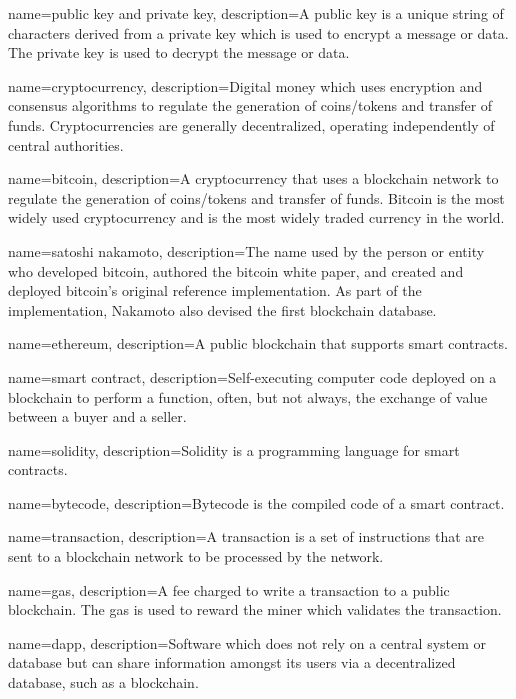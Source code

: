  {
	name=public key and private key,
	description={A public key is a unique string of characters derived from a private key which is used to encrypt a message or data. The private key is used to decrypt the message or data.}
}


 {
	name=cryptocurrency,
	description={Digital money which uses encryption and consensus algorithms to regulate the generation of coins/tokens and transfer of funds. Cryptocurrencies are generally decentralized, operating independently of central authorities.}
}

 {
	name=bitcoin,
	description={A cryptocurrency that uses a blockchain network to regulate the generation of coins/tokens and transfer of funds. Bitcoin is the most widely used cryptocurrency and is the most widely traded currency in the world.}
}

 {
	name=satoshi nakamoto,
	description={The name used by the person or entity who developed bitcoin, authored the bitcoin white paper, and created and deployed bitcoin's original reference implementation. As part of the implementation, Nakamoto also devised the first blockchain database.}
}


 {
	name=ethereum,
	description={A public blockchain that supports smart contracts.}
}

 {
	name=smart contract,
	description={Self-executing computer code deployed on a blockchain to perform a function, often, but not always, the exchange of value between a buyer and a seller.}
}

 {
	name=solidity,
	description={Solidity is a programming language for smart contracts.}
}

 {
	name=bytecode,
	description={Bytecode is the compiled code of a smart contract.}
}

 {
	name=transaction,
	description={A transaction is a set of instructions that are sent to a blockchain network to be processed by the network.}
}

 {
	name=gas,
	description={A fee charged to write a transaction to a public blockchain. The gas is used to reward the miner which validates the transaction.}
}

 {
	name=dapp,
	description={Software which does not rely on a central system or database but can share information amongst its users via a decentralized database, such as a blockchain.}
}

